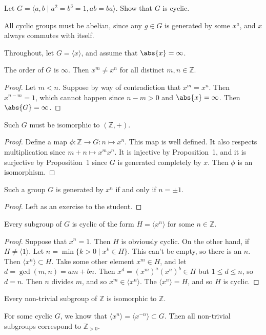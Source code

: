 \begin{problem}
Let $G = \langle a,b \mid a^2 = b^3 = 1, ab = ba \rangle$. Show that $G$ is cyclic.
\end{problem}

\begin{corollary}
All cyclic groups must be abelian, since any $g \in G$ is generated by some $x^a$, and $x$ always commutes with itself.
\end{corollary}

\begin{example}
Throughout, let $G = \langle x \rangle$, and assume that $\abs{x} = \infty$.

\begin{proposition}
The order of $G$ is $\infty$. Then $x^m \not= x^n$ for all distinct $m,n \in \mathbb{Z}$.
\end{proposition}

\begin{proof}
Let $m < n$. Suppose by way of contradiction that $x^m = x^n$. Then $x^{n-m} = 1$, which cannot happen since $n-m > 0$ and $\abs{x} = \infty$. Then $\abs{G} = \infty$.
\end{proof}

\begin{proposition}
Such $G$ must be isomorphic to $(\mathbb{Z}, +)$.
\end{proposition}
\begin{proof}
Define a map $\phi : \mathbb{Z} \to G : n \mapsto x^n$. This map is well defined. It also respects multiplication since $m+n \mapsto x^mx^n$. It is injective by Proposition~1, and it is surjective by Proposition~1 since $G$ is generated completely by $x$. Then $\phi$ is an isomorphism.
\end{proof}

\begin{proposition}
Such a group $G$ is generated by $x^n$ if and only if $n = \pm 1$.
\end{proposition}
\begin{proof}
Left as an exercise to the student.
\end{proof}

\begin{proposition}
Every subgroup of $G$ is cyclic of the form $H = \langle x^n \rangle$ for some $n \in \mathbb{Z}$.
\end{proposition}
\begin{proof}
Suppose that $x^n = 1$. Then $H$ is obviously cyclic. On the other hand, if $H \not= \langle 1 \rangle$. Let $n = \min\{k > 0 \mid x^k \in H\}$. This can't be empty, so there is an $n$. Then $\langle x^n \rangle \subset H$. Take some other element $x^m \in H$, and let $d = \gcd(m,n) = am + bn$. Then $x^d = (x^m)^a(x^n)^b \in H$ but $1 \leq d \leq n$, so $d = n$. Then $n$ divides $m$, and so $x^m \in \langle x^n \rangle$. The $\langle x^n \rangle = H$, and so $H$ is cyclic.
\end{proof}
\end{example}
\begin{corollary}
Every non-trivial subgroup of $\mathbb{Z}$ is isomorphic to $\mathbb{Z}$.
\end{corollary}
\begin{corollary}
For some cyclic $G$, we know that $\langle x^n \rangle = \langle x^{-n} \rangle \subset G$. Then all non-trivial subgroups correspond to $\mathbb{Z}_{>0}$.
\end{corollary}
